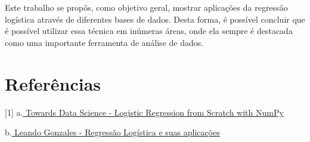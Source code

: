 \documentclass[12pt]{article}
\begin{document}
\hspace{0.4cm}Este trabalho se propôs, como objetivo geral, mostrar aplicações da regressão logística através de diferentes bases de dados. Desta forma, é possível concluir que é possível utilizar essa técnica em inúmeras áreas, onde ela sempre é destacada como uma importante ferramenta de análise de dados. 

\newpage
\section{Referências}

[1] a.\href{https://towardsdatascience.com/logistic-regression-from-scratch-with-numpy-da4cc3121ece}{ Towards Data Science - Logistic Regression from Scratch with NumPy}

\noindent [2] b.\href{https://monografias.ufma.br/jspui/bitstream/123456789/3572/1/LEANDRO-GONZALEZ.pdf}{ Leando Gonzales - Regressão Logística e suas aplicações}
\end{document}
